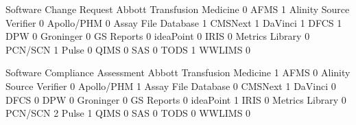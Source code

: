 \documentclass{article}
\begin{document}
\begin{Schunk}
\begin{Soutput}
                              Software Change Request
  Abbott Transfusion Medicine                       0
  AFMS                                              1
  Alinity Source Verifier                           0
  Apollo/PHM                                        0
  Assay File Database                               1
  CMSNext                                           1
  DaVinci                                           1
  DFCS                                              1
  DPW                                               0
  Groninger                                         0
  GS Reports                                        0
  ideaPoint                                         0
  IRIS                                              0
  Metrics Library                                   0
  PCN/SCN                                           1
  Pulse                                             0
  QIMS                                              0
  SAS                                               0
  TODS                                              1
  WWLIMS                                            0
                             
                              Software Compliance Assessment
  Abbott Transfusion Medicine                              1
  AFMS                                                     0
  Alinity Source Verifier                                  0
  Apollo/PHM                                               1
  Assay File Database                                      0
  CMSNext                                                  1
  DaVinci                                                  0
  DFCS                                                     0
  DPW                                                      0
  Groninger                                                0
  GS Reports                                               0
  ideaPoint                                                1
  IRIS                                                     0
  Metrics Library                                          0
  PCN/SCN                                                  2
  Pulse                                                    1
  QIMS                                                     0
  SAS                                                      0
  TODS                                                     0
  WWLIMS                                                   0
                             

\end{Soutput}
\end{Schunk}
\end{document}
